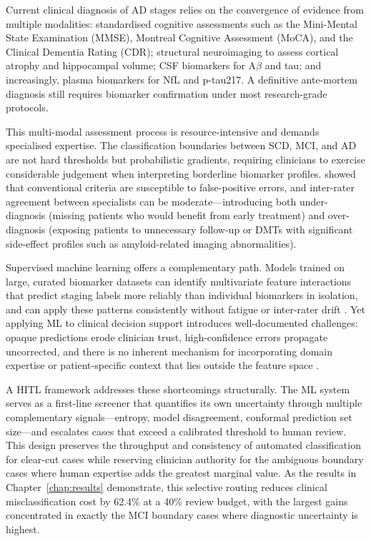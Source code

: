 Current clinical diagnosis of AD stages relies on the convergence of evidence
from multiple modalities: standardised cognitive assessments such as the
Mini-Mental State Examination (MMSE), Montreal Cognitive Assessment (MoCA), and
the Clinical Dementia Rating (CDR); structural neuroimaging to assess cortical
atrophy and hippocampal volume; CSF biomarkers for A$\beta$ and tau; and
increasingly, plasma biomarkers for NfL and p-tau217. A definitive ante-mortem
diagnosis still requires biomarker confirmation under most research-grade
protocols.

This multi-modal assessment process is resource-intensive and demands
specialised expertise. The classification boundaries between SCD, MCI, and AD
are not hard thresholds but probabilistic gradients, requiring clinicians to
exercise considerable judgement when interpreting borderline biomarker
profiles. \citet{edmonds2015mci} showed that conventional criteria are
susceptible to false-positive errors, and inter-rater agreement between
specialists can be moderate---introducing both under-diagnosis (missing
patients who would benefit from early treatment) and over-diagnosis (exposing
patients to unnecessary follow-up or DMTs with significant side-effect
profiles such as amyloid-related imaging abnormalities).

Supervised machine learning offers a complementary path. Models trained on
large, curated biomarker datasets can identify multivariate feature
interactions that predict staging labels more reliably than individual
biomarkers in isolation, and can apply these patterns consistently without
fatigue or inter-rater drift \citep{rathore2017review}. Yet applying ML to
clinical decision support introduces well-documented challenges: opaque
predictions erode clinician trust, high-confidence errors propagate
uncorrected, and there is no inherent mechanism for incorporating domain
expertise or patient-specific context that lies outside the feature
space \citep{topol2019highperformance}.

A HITL framework addresses these shortcomings structurally. The ML system
serves as a first-line screener that quantifies its own uncertainty through
multiple complementary signals---entropy, model disagreement, conformal
prediction set size---and escalates cases that exceed a calibrated threshold to
human review. This design preserves the throughput and consistency of
automated classification for clear-cut cases while reserving clinician
authority for the ambiguous boundary cases where human expertise adds the
greatest marginal value. As the results in Chapter~\ref{chap:results}
demonstrate, this selective routing reduces clinical misclassification cost by
62.4\% at a 40\% review budget, with the largest gains concentrated in exactly
the MCI boundary cases where diagnostic uncertainty is highest.


